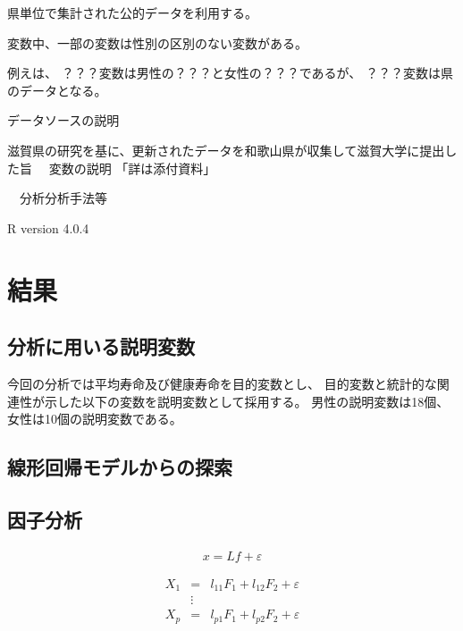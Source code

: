 \documentclass[a4j,11pt,mc, twocolumn]{jreport}
\begin{document}
県単位で集計された公的データを利用する。

変数中、一部の変数は性別の区別のない変数がある。

例えは、
？？？変数は男性の？？？と女性の？？？であるが、
？？？変数は県のデータとなる。



データソースの説明


滋賀県の研究を基に、更新されたデータを和歌山県が収集して滋賀大学に提出した旨
　変数の説明
「詳は添付資料」

　分析分析手法等

R version 4.0.4



\chapter{結果}






	\section{分析に用いる説明変数}

今回の分析では平均寿命及び健康寿命を目的変数とし、
目的変数と統計的な関連性が示した以下の変数を説明変数として採用する。
男性の説明変数は18個、女性は10個の説明変数である。







	\section{線形回帰モデルからの探索}



	\section{因子分析}



	\begin{eqnarray}
	x=Lf+\varepsilon
	\end{eqnarray}

	\begin{eqnarray}
	X_1 &=&l_{11}F_1+l_{12}F_2+\varepsilon\\
	&\vdots&\\
	X_p &=&l_{p1}F_1+l_{p2}F_2+\varepsilon
	\end{eqnarray}
\end{document}
